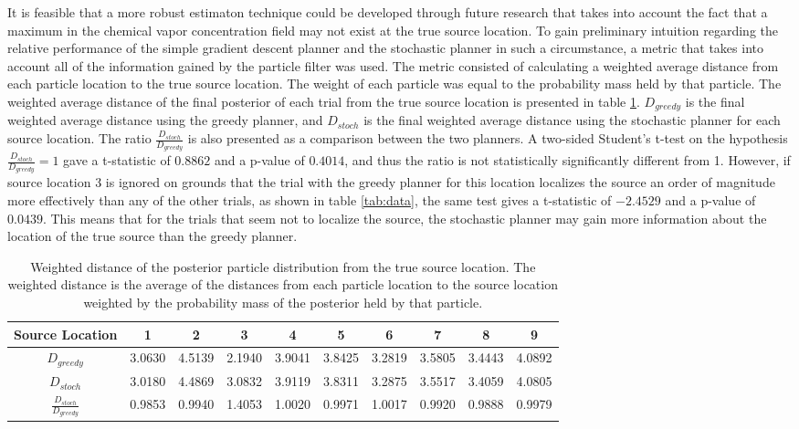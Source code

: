\documentclass[submit, 12pt]{aiaa-pretty-modified}
\begin{document}
It is feasible that a more robust estimaton technique could be developed through
future research that takes into account the fact that a maximum in the
chemical vapor concentration field may not exist at the true source
location.  To gain preliminary intuition regarding the relative performance of the simple gradient descent planner and the
stochastic planner in such a circumstance, a metric that takes into
account all of the information gained by the particle filter was used.  The metric consisted of calculating a
weighted average distance from each particle location to the true
source location.  The weight of each particle was equal to the
probability mass held by that particle.  The weighted average distance
of the final posterior of each trial from the true source location is
presented in table \ref{tab:weighted-distance}.  $D_{greedy}$ is the final
weighted average distance using the greedy planner, and
$D_{stoch}$ is the final weighted average distance using the
stochastic planner for each source location.  The ratio
$\frac{D_{stoch}}{D_{greedy}}$ is also presented as a comparison
between the two planners.  A two-sided Student's t-test on the
hypothesis $\frac{D_{stoch}}{D_{greedy}} = 1$ gave a t-statistic of
$0.8862$ and a p-value of $0.4014$, and thus the ratio is not
statistically significantly different from 1.  However, if source
location 3 is ignored on grounds that the trial with the greedy
planner for this location localizes the source an order of magnitude
more effectively than any of the other trials, as shown in
table \ref{tab:data}, the same test
gives a t-statistic of $-2.4529$ and a p-value
of $0.0439$.  This means that for the trials that seem not to
localize the source, the stochastic planner may gain more information
about the location of the true source than the greedy planner.

\begin{table}[htb]
\begin{center}
\begin{tabular}{|c||c||c||c||c||c||c||c||c||c|}
\hline
 Source Location & 1 & 2 & 3 & 4 & 5 & 6 & 7 & 8 & 9 \\
\hline \hline
$D_{greedy}$ & 3.0630 & 4.5139 & 2.1940 & 3.9041 & 3.8425 & 3.2819 & 3.5805 & 3.4443 & 4.0892 \\
\hline
$D_{stoch}$ & 3.0180 & 4.4869 & 3.0832 & 3.9119 & 3.8311 & 3.2875 & 3.5517 & 3.4059 & 4.0805 \\
\hline
$\frac{D_{stoch}}{D_{greedy}}$ & 0.9853 & 0.9940 & 1.4053 & 1.0020 & 0.9971 & 1.0017 & 0.9920 & 0.9888 & 0.9979 \\
\hline
\end{tabular}
\caption[Probabilistically weighted distance from the posterior estimate to the
source location]{Weighted distance of the posterior particle distribution from the true
  source location. The weighted distance is the average of the distances from
  each particle location to the source location weighted by the probability
  mass of the posterior held by that particle.}
\label{tab:weighted-distance}
\end{center}
\end{table}
\end{document}
